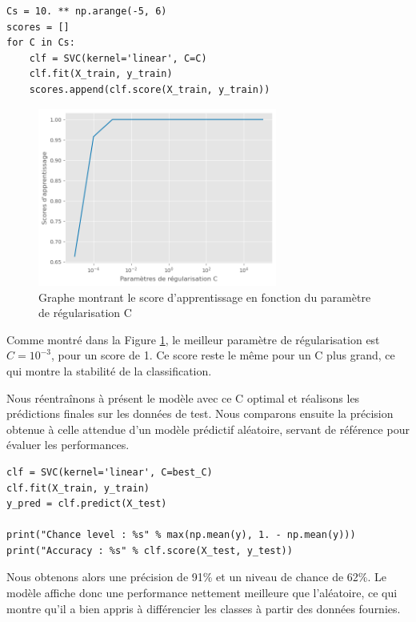 \documentclass{article}
\begin{document}
\begin{lstlisting}
Cs = 10. ** np.arange(-5, 6)
scores = []
for C in Cs:
    clf = SVC(kernel='linear', C=C)
    clf.fit(X_train, y_train)
    scores.append(clf.score(X_train, y_train)) 
\end{lstlisting}

\begin{figure}[H]
    \centering
    \includegraphics[width=0.7\textwidth]{../images/classification.png}
    \caption{\centering Graphe montrant le score d'apprentissage en fonction du paramètre de régularisation C} 
    \label{fig:score}
\end{figure}

\hspace{7pt} Comme montré dans la Figure \ref{fig:score}, le meilleur paramètre de régularisation est $C = 10^{-3}$, pour un score de 1. Ce score reste le même pour un C plus grand, ce qui montre la stabilité de la classification.\newline

\hspace{7pt} Nous réentraînons à présent le modèle avec ce C optimal et réalisons les prédictions finales sur les données de test. Nous comparons ensuite la précision obtenue à celle attendue d'un modèle prédictif aléatoire, servant de référence pour évaluer les performances.
\begin{lstlisting}
clf = SVC(kernel='linear', C=best_C)
clf.fit(X_train, y_train)
y_pred = clf.predict(X_test)

print("Chance level : %s" % max(np.mean(y), 1. - np.mean(y)))
print("Accuracy : %s" % clf.score(X_test, y_test))
\end{lstlisting}

\hspace{7pt} Nous obtenons alors une précision de 91\% et un niveau de chance de 62\%. Le modèle affiche donc une performance nettement meilleure que l'aléatoire, ce qui montre qu'il a bien appris à différencier les classes à partir des données fournies.\newline
\end{document}
